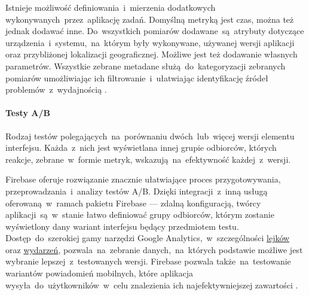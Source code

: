 Istnieje możliwość definiowania~i~mierzenia dodatkowych wykonywanych~przez~aplikację zadań. Domyślną metryką jest czas, można też jednak dodawać inne. Do~wszystkich pomiarów dodawane~są~atrybuty dotyczące urządzenia~i~systemu,~na~którym były wykonywane, używanej wersji aplikacji oraz przybliżonej lokalizacji geograficznej. Możliwe jest też dodawanie własnych parametrów. Wszystkie zebrane metadane służą~do~kategoryzacji zebranych pomiarów umożliwiając ich  filtrowanie~i~ułatwiając identyfikację źródeł problemów~z~wydajnością \cite{Fb_Pref_Monitor}.

\paragraph{Testy A/B}
Rodzaj testów polegających~na~porównaniu dwóch~lub~więcej wersji elementu interfejsu. Każda~z~nich jest wyświetlana innej grupie odbiorców, których reakcje, zebrane~w~formie metryk, wskazują~na~efektywność każdej~z~wersji. 

Firebase oferuje rozwiązanie znacznie ułatwiające proces przygotowywania, przeprowadzania~i~analizy testów A/B. Dzięki integracji~z~inną usługą oferowaną~w~ramach pakietu Firebase --- zdalną konfiguracją, twórcy aplikacji~są~w~stanie łatwo definiować grupy odbiorców, którym zostanie wyświetlony dany wariant interfejsu będący przedmiotem testu. Dostęp~do~szerokiej gamy narzędzi Google Analytics,~w~szczególności \hyperref[par:ga-funnels]{lejków} oraz  \hyperref[par:ga-events]{wydarzeń}, pozwala~na~zebranie danych,~na~których podstawie możliwe jest wybranie lepszej~z~testowanych wersji. Firebase pozwala także~na~testowanie wariantów powiadomień mobilnych, które aplikacja wysyła~do~użytkowników~w~celu znalezienia ich najefektywniejszej zawartości \cite{Fb_AB_Testing}.
